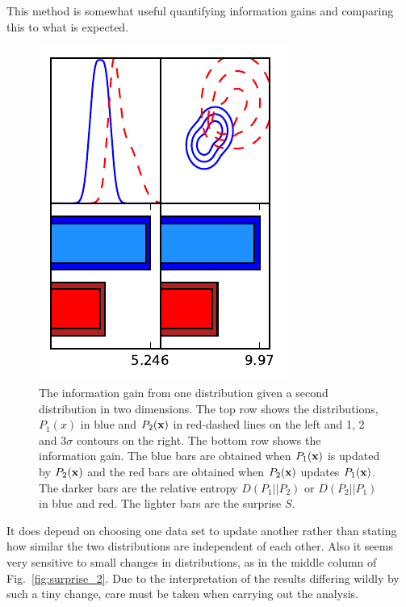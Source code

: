 \documentclass[twocolumn]{revtex4-1}
\begin{document}
    \\
    \\
    This method is somewhat useful quantifying information gains and comparing this to what is expected.
        \begin{figure}
        \centering
        \includegraphics{../comparison/plots/surprise_skew.pdf}
        \caption{The information gain from one distribution given a second distribution in two dimensions.
                 The top row shows the distributions, $P_1(x)$ in blue and $P_2({\bf x})$ in red-dashed lines on the left and 1, 2 and 3$\sigma$ contours on the right.
                 The bottom row shows the information gain.
                 The blue bars are obtained when $P_1({\bf x})$ is updated by $P_2({\bf x})$ and the red bars are obtained when $P_2({\bf x})$ updates $P_1({\bf x})$.
                 The darker bars are the relative entropy $D(P_1||P_2)$ or $D(P_2||P_1)$ in blue and red.
                 The lighter bars are the surprise $S$.}
        \label{fig:surprise_skew}
    \end{figure}
    \noindent It does depend on choosing one data set to update another rather than stating how similar the two distributions are independent of each other.
    Also it seems very sensitive to small changes in distributions, as in the middle column of Fig.~\ref{fig:surprise_2}.
    Due to the interpretation of the results differing wildly by such a tiny change, care must be taken when carrying out the analysis.
    \\
    \\
\end{document}
